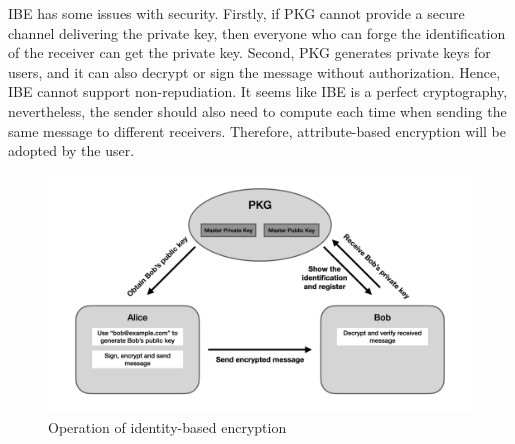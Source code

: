\documentclass[12pt]{article}
\begin{document}
IBE has some issues with security. Firstly, if PKG cannot provide a secure channel delivering the private key, then everyone who can forge the identification of the receiver can get the private key. Second, PKG generates private keys for users, and it can also decrypt or sign the message without authorization. Hence, IBE cannot support non-repudiation. It seems like IBE is a perfect cryptography, nevertheless, the sender should also need to compute each time when sending the same message to different receivers. Therefore, attribute-based encryption will be adopted by the user.

\begin{figure}
\begin{center}
    \includegraphics[width=1.0\textwidth]{assets/figures/IBE}
\end{center}
\caption{Operation of identity-based encryption}
\label{fig:IBE}
\end{figure}
\end{document}
